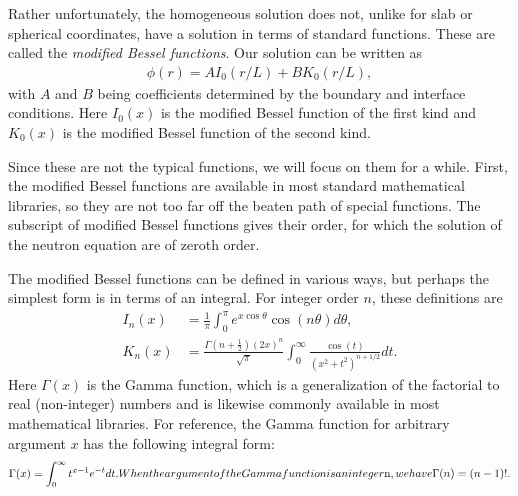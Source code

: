 Rather unfortunately, the homogeneous solution does not, unlike for slab or spherical coordinates, have a solution in terms of standard functions. These are called the \emph{modified Bessel functions}. Our solution can be written as
\begin{align} \label{Eq:neutronics_diffusionHomogeneous_1DCylindricalModifiedBessel}
  \phi(r) = A I_0( r/L ) + B K_0( r/L ),
\end{align}
with $A$ and $B$ being coefficients determined by the boundary and interface conditions. Here $I_0(x)$ is the modified Bessel function of the first kind and $K_0(x)$ is the modified Bessel function of the second kind.

Since these are not the typical functions, we will focus on them for a while. First, the modified Bessel functions are available in most standard mathematical libraries, so they are not too far off the beaten path of special functions. The subscript of modified Bessel functions gives their order, for which the solution of the neutron equation are of zeroth order. 

The modified Bessel functions can be defined in various ways, but perhaps the simplest form is in terms of an integral. For integer order $n$, these definitions are
\begin{subequations}
\begin{align}
  I_n(x) &= \frac{1}{\pi} \int_0^\pi e^{x \cos\theta } \cos(n \theta) d\theta, \\
  K_n(x) &= \frac{ \Gamma\left( n + \frac{1}{2} \right) (2x)^n }{ \sqrt{\pi} } \int_0^\infty \frac{ \cos(t) }{ ( x^2 + t^2 )^{n + 1/2} } dt .
\end{align}
\end{subequations}
Here $\Gamma(x)$ is the Gamma function, which is a generalization of the factorial to real (non-integer) numbers and is likewise commonly available in most mathematical libraries. For reference, the Gamma function for arbitrary argument $x$ has the following integral form:
\begin{subequations}
\begin{align}
  \Gamma(x) = \int_0^\infty t^{x-1} e^{-t} dt .
\end{align}
When the argument of the Gamma function is an integer $n$, we have
\begin{align}
  \Gamma(n) = ( n - 1 )! .
\end{align}
\end{subequations}


